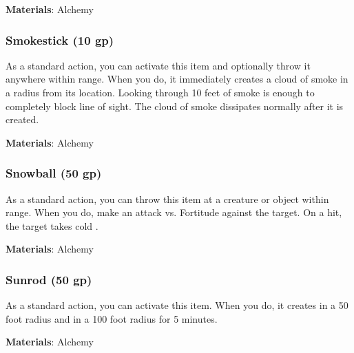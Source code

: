 \vspace{0.25em}
\textbf{Materials}: Alchemy


\lowercase{\hypertarget{item:Smokestick}{}}\label{item:Smokestick}
\hypertarget{item:Smokestick}{\subsubsection{Smokestick\hfill{} (10 gp)}}

As a standard action, you can activate this item and optionally throw it anywhere within \rngclose range.
When you do, it immediately creates a cloud of smoke in a \areasmall radius from its location.
Looking through 10 feet of smoke is enough to completely block line of sight.
The cloud of smoke dissipates normally after it is created.



\vspace{0.25em}
\textbf{Materials}: Alchemy


\lowercase{\hypertarget{item:Snowball}{}}\label{item:Snowball}
\hypertarget{item:Snowball}{\subsubsection{Snowball\hfill{} (50 gp)}}

As a standard action, you can throw this item at a creature or object within \rngclose range.
When you do, make an attack vs. Fortitude against the target.
On a hit, the target takes cold .



\vspace{0.25em}
\textbf{Materials}: Alchemy


\lowercase{\hypertarget{item:Sunrod}{}}\label{item:Sunrod}
\hypertarget{item:Sunrod}{\subsubsection{Sunrod\hfill{} (50 gp)}}

As a standard action, you can activate this item.
When you do, it creates  in a 50 foot radius and  in a 100 foot radius for 5 minutes.



\vspace{0.25em}
\textbf{Materials}: Alchemy


